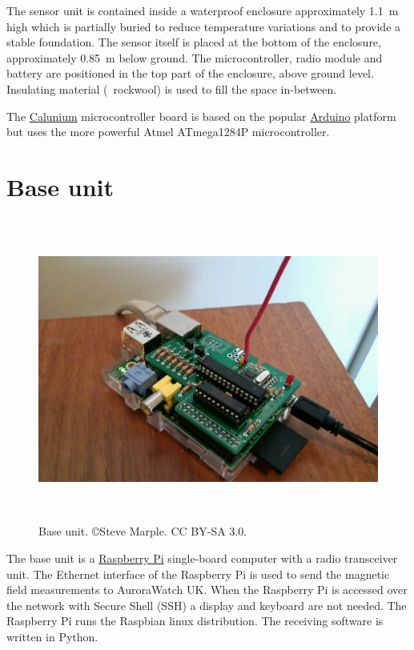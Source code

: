 The sensor unit is contained inside a waterproof enclosure
approximately \SI{1.1}{\metre} high which is partially buried to reduce
temperature variations and to provide a stable foundation. The sensor
itself is placed at the bottom of the enclosure, approximately
\SI{0.85}{\metre} below ground. The microcontroller, radio module and
battery are positioned in the top part of the enclosure, above ground
level. Insulating material (\eg\ rockwool) is used to fill the space
in-between.

The
\href{http://blog.stevemarple.co.uk/search/label/Calunium}{Calunium}
microcontroller board is based on the popular
\href{http://arduino.cc}{Arduino} platform but uses the more powerful
Atmel ATmega1284P microcontroller.

\section{Base unit}

\begin{figure}
  \centering
  \includegraphics[keepaspectratio,height=10cm]{images/base-unit}
  \caption[Base unit]%
  {Base unit. \small{\copyright Steve Marple. CC BY-SA 3.0.}}
  \label{fig:base-unit}
\end{figure}

The base unit is a \href{http://www.raspberrypi.org/‎}{Raspberry Pi}
single-board computer with a radio transceiver unit. The Ethernet
interface of the Raspberry Pi is used to send the magnetic field
measurements to AuroraWatch UK. When the Raspberry Pi is accessed over
the network with Secure Shell (SSH) a display and keyboard are not
needed. The Raspberry Pi runs the Raspbian linux distribution. The
receiving software is written in Python.


